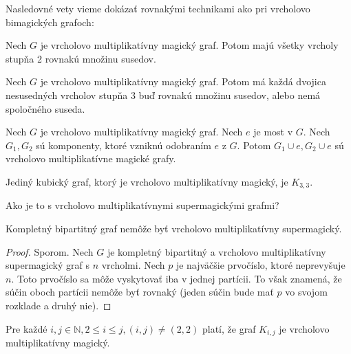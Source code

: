 Nasledovné vety vieme dokázať rovnakými technikami ako pri vrcholovo bimagických grafoch:

\begin{theorem} Nech $G$ je vrcholovo multiplikatívny magický graf. Potom majú všetky vrcholy stupňa 2 rovnakú množinu susedov.
\end{theorem}

\begin{theorem} Nech $G$ je vrcholovo multiplikatívny magický graf. Potom má každá dvojica nesusedných vrcholov stupňa 3 buď rovnakú množinu susedov, alebo nemá spoločného suseda.
\end{theorem}

\begin{theorem} Nech $G$ je vrcholovo multiplikatívny magický graf. Nech $e$ je most v $G$. Nech $G_1, G_2$ sú komponenty, ktoré vzniknú odobraním $e$ z $G$. Potom $G_1 \cup e, G_2 \cup e$ sú vrcholovo multiplikatívne magické grafy. 
\end{theorem}

\begin{theorem} Jediný kubický graf, ktorý je vrcholovo multiplikatívny magický, je $K_{3,3}$.
\end{theorem}

Ako je to s vrcholovo multiplikatívnymi supermagickými grafmi?

\begin{theorem} Kompletný bipartitný graf nemôže byť vrcholovo multiplikatívny supermagický.
\end{theorem}

\begin{proof} Sporom. Nech $G$ je kompletný bipartitný a vrcholovo multiplikatívny supermagický graf s $n$ vrcholmi. Nech $p$ je najväčšie prvočíslo, ktoré neprevyšuje $n$. Toto prvočíslo sa môže vyskytovať iba v jednej partícii. To však znamená, že súčin oboch partícii nemôže byť rovnaký (jeden súčin bude mať $p$ vo svojom rozklade a druhý nie).
\end{proof}

\begin{theorem}
\label{vmmgkij}
Pre každé $i,j \in \mathbb{N}, 2 \leq i \leq j, (i, j) \neq (2, 2)$ platí, že graf $K_{i,j}$ je vrcholovo multiplikatívny magický.
\end{theorem}

